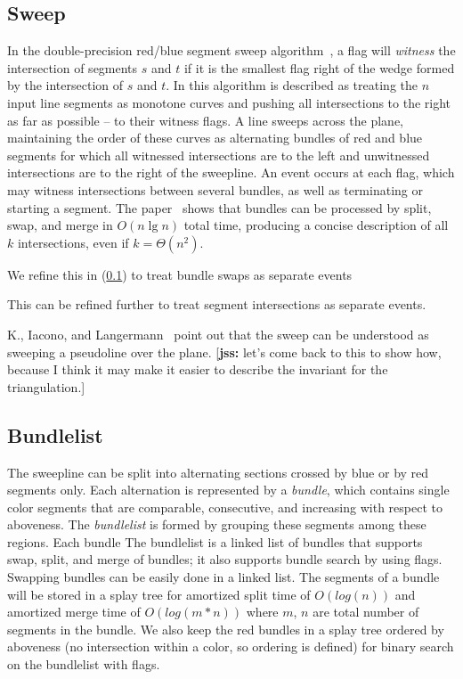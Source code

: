 \documentclass[11pt]{article}
\def\jss#1{{\footnotesize [{\bf jss:} #1]}}
\begin{document}
\subsection{Sweep}\label{sec sweep}
In the double-precision red/blue segment sweep algorithm~\cite{MS}, a flag will \textit{witness} the intersection of segments $s$ and $t$ if it is the smallest flag right of the wedge formed by the intersection of $s$ and $t$.
In \cite{MS} this algorithm is described as 
treating the $n$ input line segments as monotone curves and pushing all intersections to the right as far as possible -- to their witness flags. 
A line sweeps across the plane, maintaining the order of these curves as alternating bundles of red and blue segments for which all witnessed intersections are to the left and unwitnessed intersections are to the right of the sweepline. 
An event occurs at each flag, which may witness intersections between several bundles, as well as terminating or starting a segment.  
The paper~\cite{MS} shows that bundles can be processed by split, swap, and merge in $O(n\lg n)$ total time, producing a concise description of all $k$ intersections, even if $k=\Theta(n^2)$.

We refine this in (\ref{sec sweep}) to treat bundle swaps as separate events

This can be refined further to treat segment intersections as separate events. 

K., Iacono, and Langermann~\cite{}  point out that the sweep can be understood as sweeping a pseudoline over the plane.  \jss{let's come back to this to show how, because I think it may make it easier to describe the invariant for the triangulation.}

\subsection{Bundlelist}
The sweepline can be split into alternating sections crossed by blue or by red segments only.
Each alternation is represented by a \textit{bundle}, which contains single color segments that are comparable, consecutive, and increasing with respect to aboveness.
The \textit{bundlelist}
 is formed by grouping these segments among these regions.
Each bundle 
The bundlelist is  a linked list of bundles that supports swap, split, and merge of bundles; it also supports bundle search by using flags.
Swapping bundles can be easily done in a linked list.
The segments of a bundle will be stored in a splay tree for amortized split time of $O(log(n))$ and amortized merge time of $O(log(m*n))$ where $m$, $n$ are total number of segments in the bundle.
We also keep the red bundles in a splay tree ordered by aboveness (no intersection within a color, so ordering is defined) for binary search on the bundlelist with flags.
\end{document}
